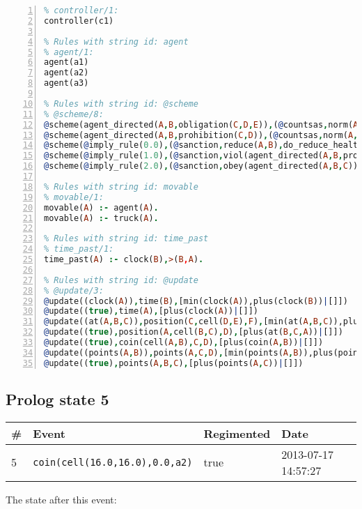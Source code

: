 \documentclass[11pt]{article}\usepackage[utf8]{inputenc}\usepackage{geometry}
\begin{document}
\begin{lstlisting}[language=Prolog, numbers=left]
% Rules with string id: controller
% controller/1:
controller(c1)

% Rules with string id: agent
% agent/1:
agent(a1)
agent(a2)
agent(a3)

% Rules with string id: @scheme
% @scheme/8:
@scheme(agent_directed(A,B,obligation(C,D,E)),(@countsas,norm(A,B,F,obligation(C,D,E)),F),false,(listTrue(C)),(time_past(D)),false,[plus(viol(agent_directed(A,B,obligation(C,D,E))))|[]],[plus(obey(agent_directed(A,B,obligation(C,D,E))))|[]])
@scheme(agent_directed(A,B,prohibition(C,D)),(@countsas,norm(A,B,E,prohibition(C,D)),E),(listTrue(C)),false,(false),false,[plus(viol(agent_directed(A,B,prohibition(C,D))))|[]],[plus(obey(agent_directed(A,B,prohibition(C,D))))|[]])
@scheme(@imply_rule(0.0),(@sanction,reduce(A,B),do_reduce_health(A,B),notifyAgent(A,changed(status))),true,false,false,false,[min(reduce(A,B))|[]],[])
@scheme(@imply_rule(1.0),(@sanction,viol(agent_directed(A,B,prohibition(C,D))),do_sanction(D)),true,false,false,false,[min(viol(agent_directed(A,B,prohibition(C,D))))|[]],[])
@scheme(@imply_rule(2.0),(@sanction,obey(agent_directed(A,B,C))),true,false,false,false,[min(obey(agent_directed(A,B,C)))|[]],[])

% Rules with string id: movable
% movable/1:
movable(A) :- agent(A).
movable(A) :- truck(A).

% Rules with string id: time_past
% time_past/1:
time_past(A) :- clock(B),>(B,A).

% Rules with string id: @update
% @update/3:
@update((clock(A)),time(B),[min(clock(A)),plus(clock(B))|[]])
@update((true),time(A),[plus(clock(A))|[]])
@update((at(A,B,C)),position(C,cell(D,E),F),[min(at(A,B,C)),plus(at(D,E,C))|[]])
@update((true),position(A,cell(B,C),D),[plus(at(B,C,A))|[]])
@update((true),coin(cell(A,B),C,D),[plus(coin(A,B))|[]])
@update((points(A,B)),points(A,C,D),[min(points(A,B)),plus(points(A,D))|[]])
@update((true),points(A,B,C),[plus(points(A,C))|[]])

\end{lstlisting}
\clearpage 
\subsection{Prolog state 5}
\begin{table}[ht]
\centering 
\begin{tabular}{l l l l} 
\textbf{\#} & \textbf{Event} & \textbf{Regimented} & \textbf{Date} \\ [0.5ex] 
\hline
5&\texttt{coin(cell(16.0,16.0),0.0,a2)}&true&2013-07-17 14:57:27\\ [1ex] \hline\end{tabular}
\end{table}
The state after this event:
\end{document}

